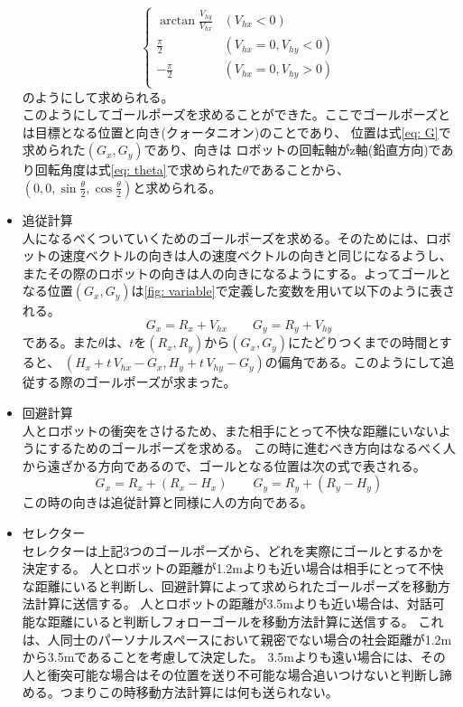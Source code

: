 \documentclass{kuisthesis}
\begin{document}
\begin{itemize}
\begin{equation}
\begin{cases}
    \arctan{\frac{V_{hy}}{V_{hx}}} & (V_{hx} < 0)\\
    \frac{\pi}{2} & (V_{hx} = 0, V_{hy} < 0)\\
    -\frac{\pi}{2} & (V_{hx} = 0, V_{hy} > 0)\\
  \end{cases}
\end{equation}
のようにして求められる。\\
\quad このようにしてゴールポーズを求めることができた。ここでゴールポーズとは目標となる位置と向き(クォータニオン)のことであり、
位置は式\ref{eq: G}で求められた$(G_x, G_y)$であり、向きは
ロボットの回転軸がz軸(鉛直方向)であり回転角度は式\ref{eq: theta}で求められた$\theta$であることから、$(0, 0, \sin\frac{\theta}{2}, \cos\frac{\theta}{2})$と求められる。

  \item 追従計算 \\
  \quad 人になるべくついていくためのゴールポーズを求める。そのためには、ロボットの速度ベクトルの向きは人の速度ベクトルの向きと同じになるようし、
  またその際のロボットの向きは人の向きになるようにする。よってゴールとなる位置$(G_x, G_y)$は\ref{fig: variable}で定義した変数を用いて以下のように表される。
  \begin{equation}G_x = R_x + V_{hx} \qquad G_y = R_y + V_{hy}\end{equation}
  である。また$\theta$は、$t$を$(R_x, R_y)$から$(G_x, G_y)$にたどりつくまでの時間とすると、
  $(H_x + t\,V_{hx} - G_x, H_y + t\,V_{hy} - G_y)$の偏角である。このようにして追従する際のゴールポーズが求まった。

  \item 回避計算 \\
  \quad 人とロボットの衝突をさけるため、また相手にとって不快な距離にいないようにするためのゴールポーズを求める。
  この時に進むべき方向はなるべく人から遠ざかる方向であるので、ゴールとなる位置は次の式で表される。
  \begin{equation}
    G_x = R_x + (R_x - H_x) \qquad G_y = R_y + (R_y - H_y)
  \end{equation}
  この時の向きは追従計算と同様に人の方向である。
  \item セレクター \\
  \quad セレクターは上記3つのゴールポーズから、どれを実際にゴールとするかを決定する。
  人とロボットの距離が1.2mよりも近い場合は相手にとって不快な距離にいると判断し、回避計算によって求められたゴールポーズを移動方法計算に送信する。
  人とロボットの距離が3.5mよりも近い場合は、対話可能な距離にいると判断しフォローゴールを移動方法計算に送信する。
  これは、人同士のパーソナルスペースにおいて親密でない場合の社会距離が1.2mから3.5mであることを考慮して決定した。
  3.5mよりも遠い場合には、その人と衝突可能な場合はその位置を送り不可能な場合追いつけないと判断し諦める。つまりこの時移動方法計算には何も送られない。


\end{itemize}
\end{document}
